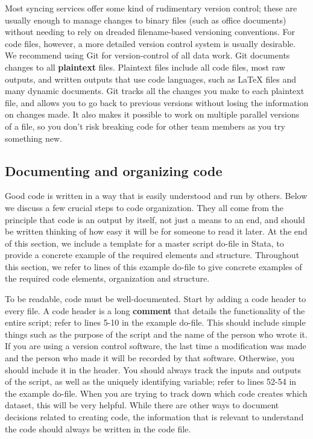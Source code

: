 Most syncing services offer some kind of rudimentary version control;
these are usually enough to manage changes to binary files (such as office documents)
without needing to rely on dreaded filename-based versioning conventions.
For code files, however, a more detailed version control system is usually desirable.
We recommend using Git for version-control of all data work.
Git documents changes to all \textbf{plaintext} files.
Plaintext files include all code files, most raw outputs,
and written outputs that use code languages,
such as {\LaTeX} files and many dynamic documents.
Git tracks all the changes you make to each plaintext file,
and allows you to go back to previous versions without losing the information on changes made.
It also makes it possible to work on multiple parallel versions of a file,
so you don't risk breaking code for other team members as you try something new.


\subsection{Documenting and organizing code}
Good code is written in a way that is easily understood and run by others.
Below we discuss a few crucial steps to code organization.
They all come from the principle that code is an output by itself,
not just a means to an end,
and should be written thinking of how easy it will be for someone to read it later.
At the end of this section, we include a template for a master script do-file in Stata,
to provide a concrete example of the required elements and structure.
Throughout this section, we refer to lines of this example do-file
to give concrete examples of the required code elements, organization and structure.

To be readable, code must be well-documented.
Start by adding a code header to every file.
A code header is a long \textbf{comment}
that details the functionality of the entire script;
refer to lines 5-10 in the example do-file.
This should include simple things such as
the purpose of the script and the name of the person who wrote it.
If you are using a version control software,
the last time a modification was made and the person who made it will be recorded by that software.
Otherwise, you should include it in the header.
You should always track the inputs and outputs of the script,
as well as the uniquely identifying variable;
refer to lines 52-54 in the example do-file.
When you are trying to track down which code creates which dataset, this will be very helpful.
While there are other ways to document decisions related to creating code,
the information that is relevant to understand the code should always be written in the code file.

